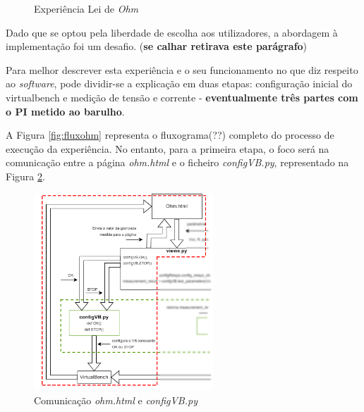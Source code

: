 \begin{figure}[hbtp]
	\centering%
		\centering
		\qquad
		\caption{Experiência Lei de \textit{Ohm}}%
		\label{fig:experienciaOHM}%
	\end{figure}

Dado que se optou pela liberdade de escolha aos utilizadores, a abordagem à implementação foi um desafio. (\textbf{se calhar retirava este parágrafo})

Para melhor descrever esta experiência e o seu funcionamento no que diz respeito ao \textit{software}, pode dividir-se a explicação em duas etapas: configuração inicial do \acrshort{virtualbench} e medição de tensão e corrente - \textbf{eventualmente três partes com o PI metido ao barulho}. 

A Figura \ref{fig:fluxohm} representa o fluxograma(??) completo do processo de execução da experiência. No entanto, para a primeira etapa, o foco será na comunicação entre a página \textit{ohm.html} e o ficheiro \textit{configVB.py}, representado na Figura \ref{fig:comohmconfigvb}.

\begin{figure}[hbtp]
	\centering
	\includegraphics[width=0.6\textwidth]{figures/experiencia_ohm_diagrama.drawio.png}
	\caption{Comunicação \textit{ohm.html} e \textit{configVB.py}}
	\label{fig:comohmconfigvb}
\end{figure}

